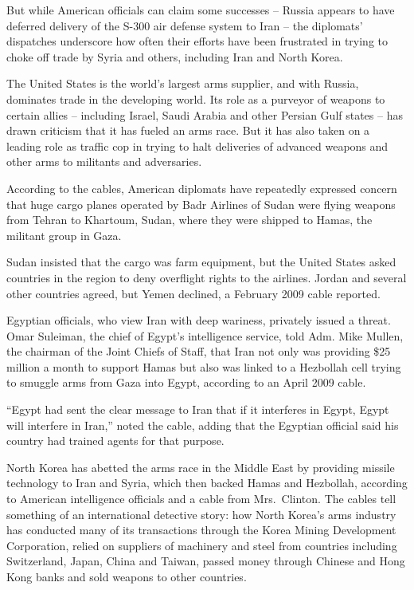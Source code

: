 ﻿\documentclass[12pt]{article}
\begin{document}
But while American officials can claim some successes -- Russia appears to have deferred delivery of
the S-300 air defense system to Iran -- the diplomats' dispatches underscore how often their efforts
have been frustrated in trying to choke off trade by Syria and others, including Iran and North
Korea.

The United States is the world's largest arms supplier, and with Russia, dominates trade in the
developing world. Its role as a purveyor of weapons to certain allies -- including Israel, Saudi
Arabia and other Persian Gulf states -- has drawn criticism that it has fueled an arms race. But it
has also taken on a leading role as traffic cop in trying to halt deliveries of advanced weapons and
other arms to militants and adversaries.

According to the cables, American diplomats have repeatedly expressed concern that huge cargo planes
operated by Badr Airlines of Sudan were flying weapons from Tehran to Khartoum, Sudan, where they
were shipped to Hamas, the militant group in Gaza.

Sudan insisted that the cargo was farm equipment, but the United States asked countries in the
region to deny overflight rights to the airlines. Jordan and several other countries agreed, but
Yemen declined, a February 2009 cable reported.

Egyptian officials, who view Iran with deep wariness, privately issued a threat. Omar Suleiman, the
chief of Egypt's intelligence service, told Adm. Mike Mullen, the chairman of the Joint Chiefs of
Staff, that Iran not only was providing \$25 million a month to support Hamas but also was linked to
a Hezbollah cell trying to smuggle arms from Gaza into Egypt, according to an April 2009 cable.

``Egypt had sent the clear message to Iran that if it interferes in Egypt, Egypt will interfere in
Iran,'' noted the cable, adding that the Egyptian official said his country had trained agents for
that purpose.

North Korea has abetted the arms race in the Middle East by providing missile technology to Iran and
Syria, which then backed Hamas and Hezbollah, according to American intelligence officials and a
cable from Mrs.~Clinton. The cables tell something of an international detective story: how North
Korea's arms industry has conducted many of its transactions through the Korea Mining Development
Corporation, relied on suppliers of machinery and steel from countries including Switzerland, Japan,
China and Taiwan, passed money through Chinese and Hong Kong banks and sold weapons to other
countries.
\end{document}
